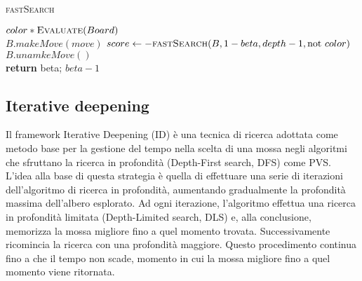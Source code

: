 \documentclass[a4paper]{article}
\begin{document}
\begin{algorithm}
  \caption{\textsc{fastSearch}}
  \label{alg_fastSeach}
  \begin{algorithmic}

        \State \Return $color * \Call{Evaluate}{Board}$
      \EndIf
      \\
        \State $B.makeMove(move)$
        \State $score \gets -\Call{fastSearch}{B, 1 - beta, depth - 1, \textrm{not } color}$
        \State $B.unamkeMove()$
        \\
        \State \textbf{return} beta;
        \EndIf
      \EndFor
      \State \Return $beta - 1$
    \EndFunction
  \end{algorithmic}
\end{algorithm}

\subsection{Iterative deepening}
Il framework Iterative Deepening (ID) è una tecnica di ricerca adottata come 
metodo base per la gestione del tempo nella scelta di una mossa negli algoritmi 
che sfruttano la ricerca in profondità (Depth-First search, DFS) come PVS. 
L'idea alla base di questa strategia è quella di effettuare una serie 
di iterazioni dell'algoritmo di ricerca in profondità, aumentando gradualmente 
la profondità massima dell'albero esplorato. Ad ogni iterazione, l'algoritmo 
effettua una ricerca in profondità limitata (Depth-Limited search, DLS) e, alla
conclusione, memorizza la mossa migliore fino a quel momento trovata. 
Successivamente ricomincia la ricerca con una profondità maggiore. Questo 
procedimento continua fino a che il tempo non scade, momento in cui la mossa 
migliore fino a quel momento viene ritornata.
\end{document}

